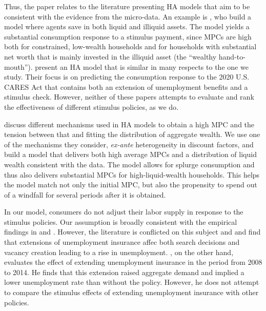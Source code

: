 \documentclass[\econtexRoot/HAFiscal]{subfiles}
\begin{document}
Thus, the paper relates to the literature presenting HA models that aim to be consistent with the evidence from the micro-data. An example is \cite{kaplan2014model}, who build a model where agents save in both liquid and illiquid assets. The model yields a substantial consumption response to a stimulus payment, since MPCs are high both for constrained, low-wealth households and for households with substantial net worth that is mainly invested in the illiquid asset (the ``wealthy hand-to-mouth''). \cite{carroll2020modeling} present an HA model that is similar in many respects to the one we study. Their focus is on predicting the consumption response to the 2020 U.S. CARES Act that contains both an extension of unemployment benefits and a stimulus check. However, neither of these papers attempts to evaluate and rank the effectiveness of different stimulus policies, as we do.

\cite{kaplanMPC2022} discuss different mechanisms used in HA models to obtain a high MPC and the tension between that and fitting the distribution of aggregate wealth. We use one of the mechanisms they consider, \textit{ex-ante} heterogeneity in discount factors, and build a model that delivers both high average MPCs and a distribution of liquid wealth consistent with the data. The model allows for splurge consumption and thus also delivers substantial MPCs for high-liquid-wealth households. This helps the model match not only the initial MPC, but also the propensity to spend out of a windfall for several periods after it is obtained. 

In our model, consumers do not adjust their labor supply in response to the stimulus policies.  Our assumption is broadly consistent with the empirical findings in \cite{ganong2022spending} and \cite{chodorow2016limited}. However, the literature is conflicted on this subject and \cite{hagedorn2017impact} and \cite{hagedorn2019unemployment} find that extensions of unemployment insurance affec both search decisions and vacancy creation leading to a rise in unemployment. \cite{kekre2022unemp}, on the other hand, evaluates the effect of extending unemployment insurance in the period from 2008 to 2014. He finds that this extension raised aggregate demand and implied a lower unemployment rate than without the policy. However, he does not attempt to compare the stimulus effects of extending unemployment insurance with other policies.
\end{document}
